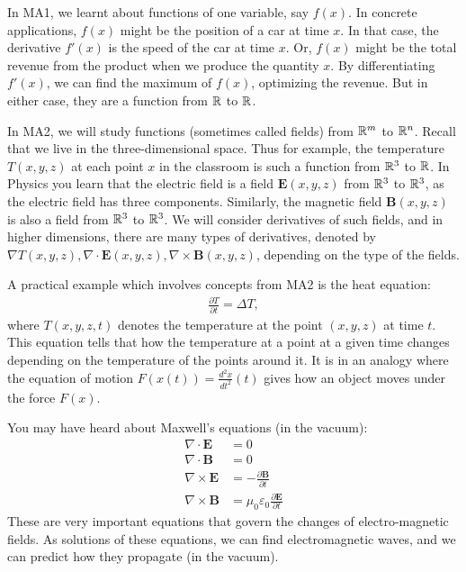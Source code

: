 In MA1, we learnt about functions of one variable, say $f(x)$.
In concrete applications, $f(x)$ might be the position of a car at time $x$. In that case, the derivative $f'(x)$ is
the speed of the car at time $x$. Or, $f(x)$ might be the total revenue from the product when we produce the quantity $x$.
By differentiating $f'(x)$, we can find the maximum of $f(x)$, optimizing the revenue.
But in either case, they are a function from $\mathbb{R}$ to $\mathbb{R}$.

In MA2, we will study functions (sometimes called fields) from $\mathbb{R}^m$ to $\mathbb{R}^n$.
Recall that we live in the three-dimensional space. Thus for example,
the temperature $T(x,y,z)$ at each point $x$ in the classroom is such a function from $\mathbb{R}^3$ to $\mathbb{R}$.
In Physics you learn that the electric field is a field $\mathbf{E}(x,y,z)$ from $\mathbb{R}^3$ to $\mathbb{R}^3$,
as the electric field has three components. Similarly, the magnetic field $\mathbf{B}(x,y,z)$ is also a field from $\mathbb{R}^3$ to $\mathbb{R}^3$.
We will consider derivatives of such fields, and in higher dimensions, there are many types of derivatives,
denoted by $\nabla T(x,y,z), \nabla \cdot \mathbf{E}(x,y,z), \nabla \times \mathbf{B}(x,y,z)$, depending on the type of the fields.

A practical example which involves concepts from MA2 is the heat equation:
\begin{align*}
 \frac{\partial T}{\partial t} = \Delta T,
\end{align*}
where $T(x,y,z,t)$ denotes the temperature at the point $(x,y,z)$ at time $t$.
This equation tells that how the temperature at a point at a given time changes depending on the temperature
of the points around it. It is in an analogy where the equation of motion $F(x(t)) = \frac{d^2 x}{dt^2}(t)$
gives how an object moves under the force $F(x)$.

You may have heard about Maxwell's equations (in the vacuum):
\begin{align*}
 \nabla \cdot \mathbf{E} &= 0 \\
 \nabla \cdot \mathbf{B} &= 0 \\
 \nabla \times \mathbf{E} &= -\frac{\partial \mathbf{B}}{\partial t} \\
 \nabla \times \mathbf{B} &= \mu_0\varepsilon_0 \frac{\partial \mathbf{E}}{\partial t}
\end{align*}
These are very important equations that govern the changes of electro-magnetic fields.
As solutions of these equations, we can find electromagnetic waves, and we can predict how they propagate (in the vacuum).


